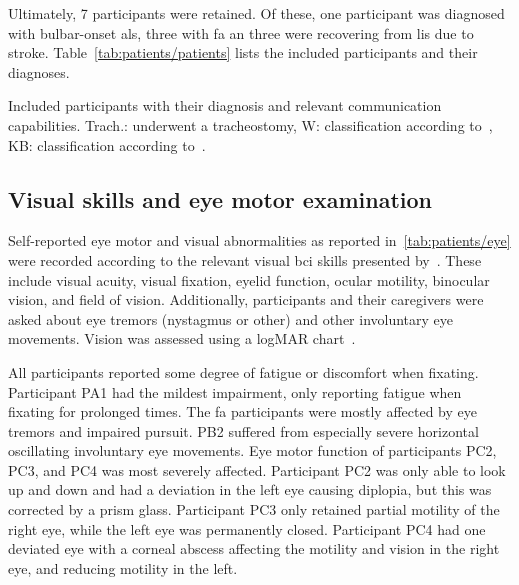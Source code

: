 \documentclass[twocolumn]{article}
\newcommand{\skill}{{\color{gdvGreen}{$\pmb{+}$}}}
\newcommand{\noskill}{{\color{gdvOrange}{$\pmb{-}$}}}
\newcommand{\snoskill}{{\color{gdvRed}{$\pmb{/}$}}}
\begin{document}
Ultimately, 7 participants were retained.
Of these, one participant was diagnosed with bulbar-onset \ac{als}, three with
\ac{fa} an three were recovering from \ac{lis} due to stroke.
Table~\ref{tab:patients/patients} lists the included participants and their
diagnoses.
\begin{table}[t]
	\centering
	\footnotesize
	
	\caption{Included participants with their diagnosis and relevant communication
		capabilities.
		Trach.: underwent a tracheostomy, W: classification according
		to~\textcite{Wolpaw2006}, KB: classification according
		to~\textcite{Kuebler2008}.
	}
	\label{tab:patients/patients}
\end{table}

\subsection{Visual skills and eye motor examination}

Self-reported eye motor and visual abnormalities as reported in~\cref{tab:patients/eye}
were recorded according to the relevant visual \ac{bci} skills presented by~\textcite{FriedOken2020}.
These include visual acuity, visual fixation, eyelid function, ocular motility,
binocular vision, and field of vision.
Additionally, participants and their caregivers were asked about eye tremors
(nystagmus or other) and other involuntary eye movements.
Vision was assessed using a logMAR chart~\cite{Bailey1976}.
\begin{table}[t]
	
	\caption[Visual skills of the included participants.]{%
		Self-reported visual skills as defined by \textcite{FriedOken2020} of
		gaze-impaired participants included in this study.
		\skill\ skilled, \noskill\ impaired, \snoskill\ severely impaired.
		Visual acuity was assessed using the logMAR scale (lower is better).}
	\label{tab:patients/eye}
\end{table}

All participants reported some degree of fatigue or discomfort when fixating.
Participant PA1 had the mildest impairment, only reporting fatigue when fixating
for prolonged times.
The \ac{fa} participants were mostly affected by eye tremors and impaired pursuit.
PB2 suffered from especially severe horizontal oscillating involuntary eye
movements.
Eye motor function of participants PC2, PC3, and PC4 was most severely affected.
Participant PC2 was only able to look up and down and had a deviation in the
left eye causing diplopia, but this was corrected by a prism glass.
Participant PC3 only retained partial motility of the right eye, while the left eye was permanently closed.
Participant PC4 had one deviated eye with a corneal abscess affecting the motility
and vision in the right eye, and reducing motility in the left.
\end{document}
